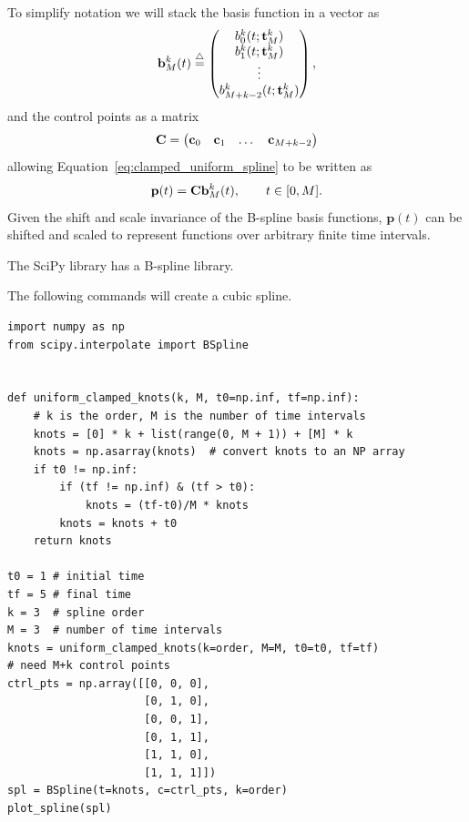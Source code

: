To simplify notation we will stack the basis function in a vector as
\begin{equation}\label{eq:basis_vector}
\bbf_M^k(t) \defeq \begin{pmatrix} b_0^k(t;\mathbf{t}_M^k) \\ b_1^k(t;\mathbf{t}_M^k) \\ \vdots \\ b_{M+k-2}^k(t;\mathbf{t}_M^k) \end{pmatrix}, 
\end{equation}
and the control points as a matrix 
\[
\mathbf{C} = \begin{pmatrix} \mathbf{c}_0 & \mathbf{c}_1 & \dots & \mathbf{c}_{M+k-2} \end{pmatrix}
\]
allowing Equation~\eqref{eq:clamped_uniform_spline} to be written as
\[
\mathbf{p}(t) = \mathbf{C} \mathbf{b}_M^k(t), \qquad t\in[0, M].
\]
Given the shift and scale invariance of the B-spline basis functions, $\mathbf{p}(t)$ can be shifted and scaled to represent functions over arbitrary finite time intervals.


\par{}
The SciPy library has a B-spline library.  

The following commands will create a cubic spline.
\begin{lstlisting}
import numpy as np
from scipy.interpolate import BSpline
	
	
def uniform_clamped_knots(k, M, t0=np.inf, tf=np.inf):
    # k is the order, M is the number of time intervals
    knots = [0] * k + list(range(0, M + 1)) + [M] * k
    knots = np.asarray(knots)  # convert knots to an NP array
    if t0 != np.inf:
        if (tf != np.inf) & (tf > t0):
            knots = (tf-t0)/M * knots
        knots = knots + t0
    return knots	

t0 = 1 # initial time
tf = 5 # final time
k = 3  # spline order
M = 3  # number of time intervals
knots = uniform_clamped_knots(k=order, M=M, t0=t0, tf=tf)
# need M+k control points
ctrl_pts = np.array([[0, 0, 0],  
                     [0, 1, 0],
                     [0, 0, 1],
                     [0, 1, 1],
                     [1, 1, 0],
                     [1, 1, 1]])
spl = BSpline(t=knots, c=ctrl_pts, k=order)
plot_spline(spl)
\end{lstlisting}

